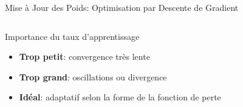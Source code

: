 \documentclass[aspectratio=169,11pt]{beamer}
\begin{document}
\begin{frame}{Mise à Jour des Poids: Optimisation par Descente de Gradient}
\begin{columns}
\begin{column}{0.5\textwidth}
            \begin{alertblock}{Importance du taux d'apprentissage}
                \begin{itemize}
                    \item \textbf{Trop petit}: convergence très lente
                    \item \textbf{Trop grand}: oscillations ou divergence
                    \item \textbf{Idéal}: adaptatif selon la forme de la fonction de perte
                \end{itemize}
            \end{alertblock}
        \end{column}
    \end{columns}
\end{frame}
\end{document}
